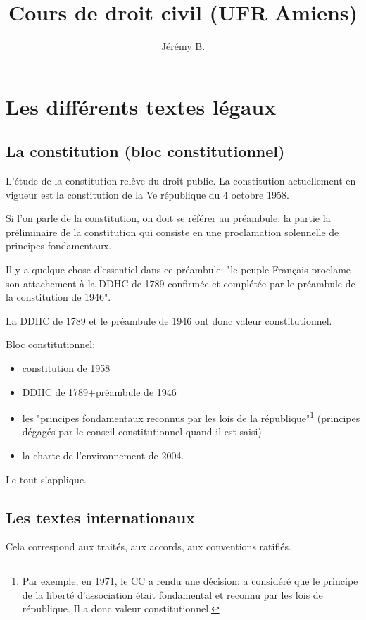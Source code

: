 \documentclass[12pt, a4paper, openany]{book}
\author{Jérémy B.}
\date{}
\title{Cours de droit civil (UFR Amiens)}
\begin{document}
\maketitle

\section{Les différents textes légaux}

\subsection{La constitution (bloc constitutionnel)}

L'étude de la constitution relève du droit public. La constitution actuellement en vigueur est la constitution de la Ve république du 4 octobre 1958.

Si l'on parle de la constitution, on doit se référer au préambule: la partie la préliminaire de la constitution qui consiste en une proclamation solennelle de principes fondamentaux. 

Il y a quelque chose d'essentiel dans ce préambule: "le peuple Français proclame son attachement à la DDHC de 1789 confirmée et complétée par le préambule de la constitution de 1946".

La DDHC de 1789 et le préambule de 1946 ont donc valeur constitutionnel.

Bloc constitutionnel: 
\begin{itemize}
\item constitution de 1958
\item DDHC de 1789+préambule de 1946
\item les "principes fondamentaux reconnus par les lois de la république"\footnote{Par exemple, en 1971, le CC a rendu une décision: a considéré que le principe de la liberté d'association était fondamental et reconnu par les lois de république. Il a donc valeur constitutionnel.} (principes dégagés par le conseil constitutionnel quand il est saisi)
\item la charte de l'environnement de 2004. 
\end{itemize}

Le tout s'applique.

\subsection{Les textes internationaux}

Cela correspond aux traités, aux accords, aux conventions ratifiés.
\end{document}
